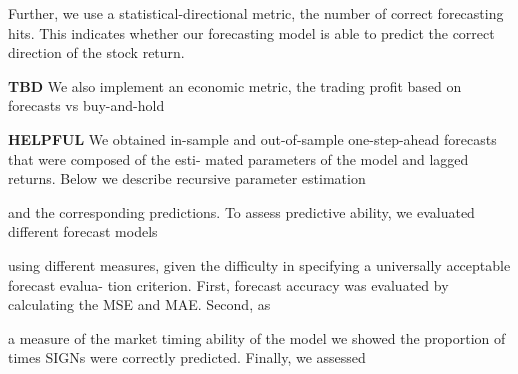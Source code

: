 Further, we use a statistical-directional metric, the number of correct forecasting hits. This indicates whether our forecasting model is able to predict the correct direction of the stock return. 

\textbf{TBD} We also implement an economic metric, the trading profit based on forecasts vs buy-and-hold

 \textbf{HELPFUL} We obtained in-sample and out-of-sample one-step-ahead forecasts that were composed of the esti-
mated parameters of the model and lagged returns. Below we describe recursive parameter estimation

and the corresponding predictions. To assess predictive ability, we evaluated different forecast models

using different measures, given the difficulty in specifying a universally acceptable forecast evalua-
tion criterion. First, forecast accuracy was evaluated by calculating the MSE and MAE. Second, as

a measure of the market timing ability of the model we showed the proportion of times SIGNs were
correctly predicted. Finally, we assessed